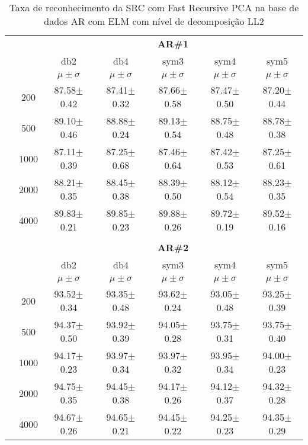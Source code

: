 \begin{table}[H]
	\centering
    \normalsize
	\caption{Taxa de reconhecimento da SRC com Fast Recursive PCA na base de dados AR com ELM com nível de decomposição LL2}
		\begin{tabular}{|c|c|c c c c c|}
\cline{3-7}
\multicolumn{2}{c|}{\multirow{3}{*}{}} & \multicolumn{5}{c|}{\textbf{AR\#1}}   \\\cline{3-7} 
\multicolumn{2}{c|}{}  & db2 & db4 & sym3 & sym4 & sym5 \\\cline{3-7}%
\multicolumn{2}{c|}{}& $\mu \pm \sigma$ & $\mu \pm \sigma$ & $\mu \pm \sigma$ & $\mu \pm \sigma$ & $\mu \pm \sigma$ \\\hline


\multicolumn{1}{|c|}{ \multirow{5}{*}{\rotatebox[origin=c]{90}{\textbf{Neurônios}}} }
&200	&87.58$\pm$0.42	&87.41$\pm$0.32	&87.66$\pm$0.58	&87.47$\pm$0.50	&87.20$\pm$0.44\\\cline{2-7}
&500	&89.10$\pm$0.46	&88.88$\pm$0.24	&89.13$\pm$0.54	&88.75$\pm$0.48	&88.78$\pm$0.38\\\cline{2-7}
&1000	&87.11$\pm$0.39	&87.25$\pm$0.68	&87.46$\pm$0.64	&87.42$\pm$0.53	&87.25$\pm$0.61\\\cline{2-7}
&2000	&88.21$\pm$0.35	&88.45$\pm$0.38	&88.39$\pm$0.50	&88.12$\pm$0.54	&88.23$\pm$0.35\\\cline{2-7}
&4000	&89.83$\pm$0.21	&89.85$\pm$0.23	&89.88$\pm$0.26	&89.72$\pm$0.19	&89.52$\pm$0.16

\\ \midrule
\multicolumn{7}{c}{}\\ 


\cline{3-7}
\multicolumn{2}{c|}{\multirow{3}{*}{}} & \multicolumn{5}{c|}{\textbf{AR\#2}}   \\\cline{3-7} 
\multicolumn{2}{c|}{}  & db2 & db4 & sym3 & sym4 & sym5 \\\cline{3-7}%
\multicolumn{2}{c|}{}& $\mu \pm \sigma$ & $\mu \pm \sigma$ & $\mu \pm \sigma$ & $\mu \pm \sigma$ & $\mu \pm \sigma$ \\\hline

\multicolumn{1}{|c|}{ \multirow{5}{*}{\rotatebox[origin=c]{90}{\textbf{Neurônios}}} }
&200	&93.52$\pm$0.34	&93.35$\pm$0.48	&93.62$\pm$0.24	&93.05$\pm$0.48	&93.25$\pm$0.39\\\cline{2-7}
&500	&94.37$\pm$0.50	&93.92$\pm$0.39	&94.05$\pm$0.28	&93.75$\pm$0.31	&93.75$\pm$0.40\\\cline{2-7}
&1000	&94.17$\pm$0.23	&93.97$\pm$0.34	&93.97$\pm$0.32	&93.95$\pm$0.34	&94.00$\pm$0.23\\\cline{2-7}
&2000	&94.75$\pm$0.35	&94.45$\pm$0.38	&94.17$\pm$0.26	&94.12$\pm$0.37	&94.32$\pm$0.28\\\cline{2-7}
&4000	&94.67$\pm$0.26	&94.65$\pm$0.21	&94.45$\pm$0.22	&94.25$\pm$0.23	&94.35$\pm$0.29
 


\end{tabular}
\end{table}
